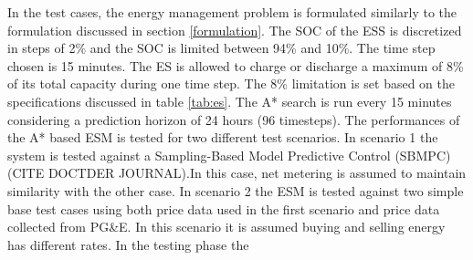 In the test cases, the energy management problem is formulated similarly to the formulation discussed in section \ref{formulation}. The  SOC of the ESS is discretized in steps of 2\% and the SOC is limited between  94\%  and  10\%. The time step chosen is 15 minutes. The ES is allowed to charge or discharge a maximum of 8\% of its total capacity during one time step. The 8\% limitation is set based on the specifications discussed in table \ref{tab:es}. The A* search is run every 15 minutes considering a prediction horizon of 24 hours (96 timesteps). The performances of the A* based ESM is tested for two different test scenarios. In scenario 1 the system is tested against a Sampling-Based Model Predictive Control (SBMPC) \colorbox{BurntOrange}{(CITE DOCTDER JOURNAL)}.In this case, net metering is assumed to maintain similarity with the other case. In scenario 2 the ESM is tested against two simple base test cases using both price data used in the first scenario and price data collected from PG\&E. In this scenario it is assumed buying and selling energy has different rates. In the testing phase the 

